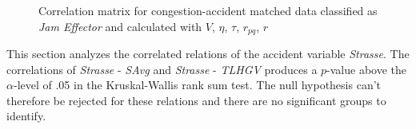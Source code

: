 \begin{figure}[!ht]
	\centering
	\caption{Correlation matrix for congestion-accident matched data classified as \textit{Jam Effector} and calculated with $V$, $\eta$, $\tau$, $r_{pq}$, $r$}
	\label{img:correlation_matrix_selected_effector_cramers}
\end{figure}

This section analyzes the correlated relations of the accident variable \textit{Strasse}. The correlations of \textit{Strasse} - \textit{SAvg} and \textit{Strasse} - \textit{TLHGV} produces a $p$-value above the $\alpha$-level of .05 in the Kruskal-Wallis rank sum test. The null hypothesis can't therefore be rejected for these relations and there are no significant groups to identify.

